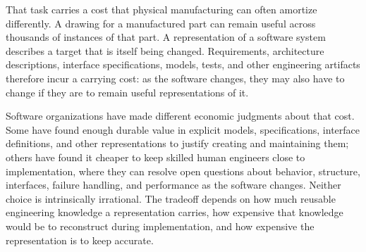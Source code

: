 
That task carries a cost that physical manufacturing can often amortize differently. A drawing for a manufactured part can remain useful across thousands of instances of that part. A representation of a software system describes a target that is itself being changed. Requirements, architecture descriptions, interface specifications, models, tests, and other engineering artifacts therefore incur a carrying cost: as the software changes, they may also have to change if they are to remain useful representations of it.


Software organizations have made different economic judgments about that cost. Some have found enough durable value in explicit models, specifications, interface definitions, and other representations to justify creating and maintaining them; others have found it cheaper to keep skilled human engineers close to implementation, where they can resolve open questions about behavior, structure, interfaces, failure handling, and performance as the software changes\citep{kautz2018mbse}. Neither choice is intrinsically irrational. The tradeoff depends on how much reusable engineering knowledge a representation carries, how expensive that knowledge would be to reconstruct during implementation, and how expensive the representation is to keep accurate.


